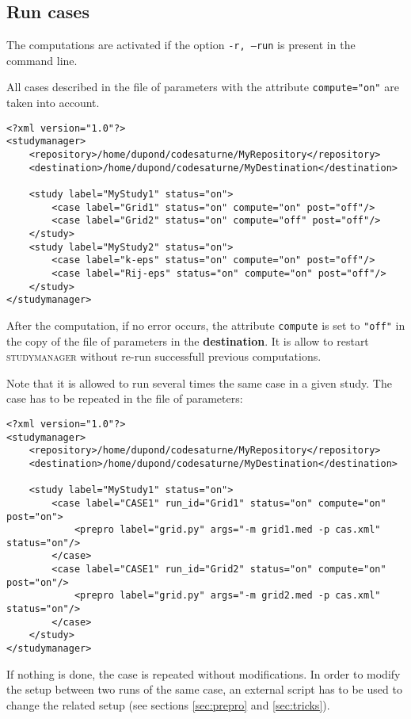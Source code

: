 \documentclass[a4paper,10pt,twoside]{csshortdoc}
\begin{document}
\subsection{Run cases}\label{sec:run}

The computations are activated if the option \texttt{-r, --run} is present in
the command line.

All cases described in the file of parameters with the attribute
\texttt{compute="on"} are taken into account.

\small
\begin{verbatim}
<?xml version="1.0"?>
<studymanager>
    <repository>/home/dupond/codesaturne/MyRepository</repository>
    <destination>/home/dupond/codesaturne/MyDestination</destination>

    <study label="MyStudy1" status="on">
        <case label="Grid1" status="on" compute="on" post="off"/>
        <case label="Grid2" status="on" compute="off" post="off"/>
    </study>
    <study label="MyStudy2" status="on">
        <case label="k-eps" status="on" compute="on" post="off"/>
        <case label="Rij-eps" status="on" compute="on" post="off"/>
    </study>
</studymanager>
\end{verbatim}
\normalsize

After the computation, if no error occurs, the attribute \texttt{compute} is set
to \texttt{"off"} in the copy of the file of parameters in the
\textbf{destination}. It is allow to restart \textsc{studymanager} without re-run
successfull previous computations.

Note that it is allowed to run several times the same case in a given study.
The case has to be repeated in the file of parameters:

\small
\begin{verbatim}
<?xml version="1.0"?>
<studymanager>
    <repository>/home/dupond/codesaturne/MyRepository</repository>
    <destination>/home/dupond/codesaturne/MyDestination</destination>

    <study label="MyStudy1" status="on">
        <case label="CASE1" run_id="Grid1" status="on" compute="on" post="on">
            <prepro label="grid.py" args="-m grid1.med -p cas.xml" status="on"/>
        </case>
        <case label="CASE1" run_id="Grid2" status="on" compute="on" post="on"/>
            <prepro label="grid.py" args="-m grid2.med -p cas.xml" status="on"/>
        </case>
    </study>
</studymanager>
\end{verbatim}
\normalsize

If nothing is done, the case is repeated without modifications. In order to modify
the setup between two runs of the same case, an external script has to be used to
change the related setup (see sections \ref{sec:prepro} and \ref{sec:tricks}).
\end{document}
